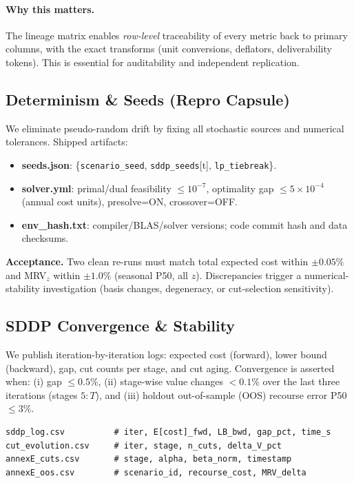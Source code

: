 \documentclass[11pt]{article}
\numberwithin{equation}{section}
\theoremstyle{definition}
\theoremstyle{remark}
\begin{document}
\paragraph{Why this matters.}
The lineage matrix enables \emph{row-level} traceability of every metric back to primary columns, with the exact transforms (unit conversions, deflators, deliverability tokens). This is essential for auditability and independent replication.

\subsection{\texorpdfstring{\quad}{ }Determinism \& Seeds (Repro Capsule)}
\label{E3}
We eliminate pseudo-random drift by fixing all stochastic sources and numerical tolerances. Shipped artifacts:

\begin{itemize}[leftmargin=1.2em]
  \item \textbf{seeds.json}: \{\texttt{scenario\_seed}, \texttt{sddp\_seeds}[t], \texttt{lp\_tiebreak}\}.
  \item \textbf{solver.yml}: primal/dual feasibility $\le 10^{-7}$, optimality gap $\le 5\times 10^{-4}$ (annual cost units), presolve=ON, crossover=OFF. 
  \item \textbf{env\_hash.txt}: compiler/BLAS/solver versions; code commit hash and data checksums.
\end{itemize}

\noindent\textbf{Acceptance.} Two clean re-runs must match total expected cost within $\pm 0.05\%$ and MRV$_z$ within $\pm 1.0\%$ (seasonal P50, all $z$). Discrepancies trigger a numerical-stability investigation (basis changes, degeneracy, or cut-selection sensitivity).

\subsection{ SDDP Convergence \& Stability}
\label{E4}
We publish iteration-by-iteration logs: expected cost (forward), lower bound (backward), gap, cut counts per stage, and cut aging. Convergence is asserted when: (i) gap $\le 0.5\%$, (ii) stage-wise value changes $<0.1\%$ over the last three iterations (stages $5{:}T$), and (iii) holdout out-of-sample (OOS) recourse error P50 $\le 3\%$.

\begin{lstlisting}[style=annexe,caption={Artifacts emitted for SDDP convergence},label={lst:artifacts}]
sddp_log.csv          # iter, E[cost]_fwd, LB_bwd, gap_pct, time_s
cut_evolution.csv     # iter, stage, n_cuts, delta_V_pct
annexE_cuts.csv       # stage, alpha, beta_norm, timestamp
annexE_oos.csv        # scenario_id, recourse_cost, MRV_delta
\end{lstlisting}
\end{document}
